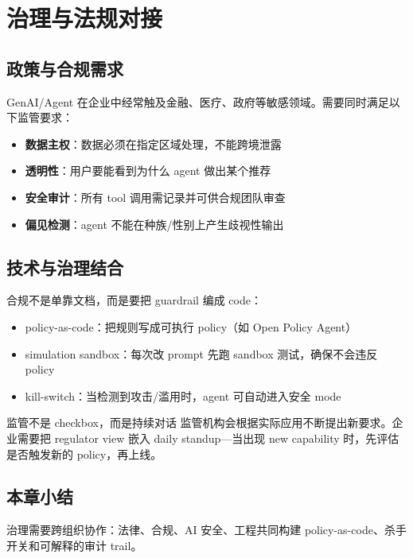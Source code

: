 \section{治理与法规对接}

\subsection{政策与合规需求}

GenAI/Agent 在企业中经常触及金融、医疗、政府等敏感领域。需要同时满足以下监管要求：

\begin{itemize}
    \item \textbf{数据主权}：数据必须在指定区域处理，不能跨境泄露
    \item \textbf{透明性}：用户要能看到为什么 agent 做出某个推荐
    \item \textbf{安全审计}：所有 tool 调用需记录并可供合规团队审查
    \item \textbf{偏见检测}：agent 不能在种族/性别上产生歧视性输出
\end{itemize}

\subsection{技术与治理结合}

合规不是单靠文档，而是要把 guardrail 编成 code：

\begin{itemize}
    \item policy-as-code：把规则写成可执行 policy（如 Open Policy Agent）
    \item simulation sandbox：每次改 prompt 先跑 sandbox 测试，确保不会违反 policy
    \item kill-switch：当检测到攻击/滥用时，agent 可自动进入安全 mode
\end{itemize}

\begin{warningbox}{监管不是 checkbox，而是持续对话}
监管机构会根据实际应用不断提出新要求。企业需要把 regulator view 嵌入 daily standup—当出现 new capability 时，先评估是否触发新的 policy，再上线。
\end{warningbox}

\subsection{本章小结}

治理需要跨组织协作：法律、合规、AI 安全、工程共同构建 policy-as-code、杀手开关和可解释的审计 trail。


